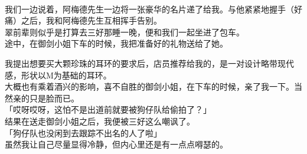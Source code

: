 
 \\

我们一边说着，阿梅德先生一边将一张豪华的名片递了给我。与他紧紧地握手（好痛）之后，我和阿梅德先生互相挥手告别。\\

翠前辈则似乎是打算去三好那睡一晚，便和我们一起坐进了包车。\\

途中，在御剑小姐下车的时候，我把准备好的礼物送给了她。

我提出想要买大颗珍珠的耳环的要求后，店员推荐给我的，是一对设计略带现代感，形状以M为基础的耳环。\\

大概也有乘着酒兴的影响，喜不自胜的御剑小姐，在下车的时候，亲了我一下。当然亲的只是脸而已。\\

「哎呀哎呀，这怕不是出道前就要被狗仔队给偷拍了？」\\

结果在送走御剑小姐之后，我便被三好这么嘲讽了。\\

「狗仔队也没闲到去跟踪不出名的人了啦」\\

虽然我让自己尽量显得冷静，但内心里还是有一点点嘚瑟的。\\
